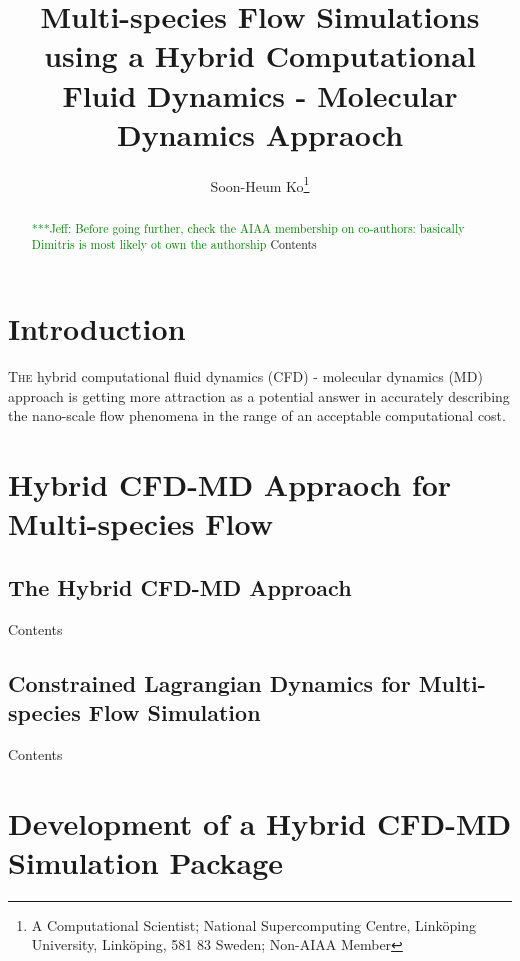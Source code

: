 \documentclass[]{aiaa-tc}%
\title{Multi-species Flow Simulations using a Hybrid Computational Fluid Dynamics - Molecular Dynamics Appraoch}
\author{
  Soon-Heum Ko\thanks{A Computational Scientist; National Supercomputing Centre, Link\"{o}ping University, Link\"{o}ping, 581 83 Sweden; Non-AIAA Member} }\\
\newcommand{\skonote}[1]{ {\textcolor{green} { ***Jeff: #1 }}}
\begin{document}
\maketitle


\begin{abstract}
\skonote{Before going further, check the AIAA membership on co-authors: basically Dimitris is most likely ot own the authorship}
Contents
\end{abstract}


\printglossary%


\section{Introduction}
\label{sec:intro}

\lettrine[nindent=0pt]{T}{he} hybrid computational fluid dynamics (CFD) - molecular dynamics (MD) approach is getting more attraction as a potential answer in accurately describing the nano-scale flow phenomena in the range of an acceptable computational cost.



\section{Hybrid CFD-MD Appraoch for Multi-species Flow}
\label{sec:hybrid}

\subsection{The Hybrid CFD-MD Approach}
\label{sec:hybrid_design}

Contents

\subsection{Constrained Lagrangian Dynamics for Multi-species Flow Simulation}
\label{sec:hybrid_multispecies}

Contents



\section{Development of a Hybrid CFD-MD Simulation Package}
\label{sec:numerics}
\end{document}
